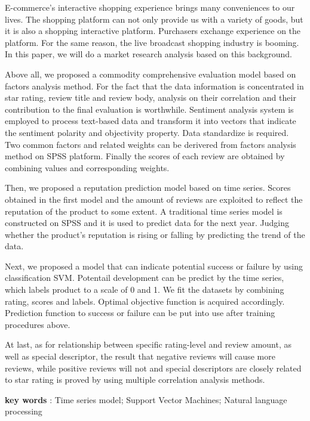 \documentclass[13pt]{ctexart}
\begin{document}
\begin{adjustwidth}{1cm}{1cm}
\indent { }{ }{ }{ }{ }{ }
E-commerce's interactive shopping experience brings many conveniences to our lives. The shopping platform can not only provide us with a variety of goods, but it is also a shopping interactive platform. Purchasers exchange experience on the platform. For the same reason, the live broadcast shopping industry is booming. In this paper, we will do a market research analysis based on this background.

Above all, we proposed a commodity comprehensive evaluation model based on factors analysis method. For the fact that the data information is concentrated in star rating, review title and review body, analysis on their correlation and their contribution to the final evaluation is worthwhile. Sentiment analysis system is employed to process text-based data and transform it into vectors that indicate the sentiment polarity and objectivity property. Data standardize is required. Two common factors and related weights can be derivered from factors analysis method on SPSS platform. Finally the scores of each review are obtained by combining values and corresponding weights.

Then, we proposed a reputation prediction model based on time series. Scores obtained in the first model and the amount of reviews are exploited to reflect the reputation of the product to some extent. A traditional time series model is constructed on SPSS and it is used to predict data for the next year. Judging whether the product's reputation is rising or falling by predicting the trend of the data.

Next, we proposed a model that can indicate potential success or failure by using classification SVM. Potentail development can be predict by the time series, which labels product to a scale of 0 and 1. We fit the datasets by combining rating, scores and labels. Optimal objective function is acquired accordingly. Prediction function to success or failure can be put into use after training procedures above.

At last, as for relationship between specific rating-level and review amount, as well as special descriptor, the result that negative reviews will cause more reviews, while positive reviews will not and special descriptors are closely related to star rating is proved by using multiple correlation analysis methods.

\vspace{15pt}
\textbf{key words} : Time series model; Support Vector Machines; Natural language processing
\end{adjustwidth} 
\end{document}
